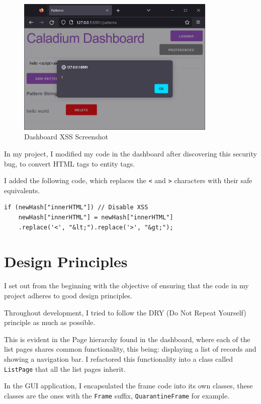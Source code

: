 \begin{figure}[h!]
    \centering
    \label{image:xssScreenshot}
    \includegraphics[width=0.85\textwidth]{images/screenshots/xss}
    \caption{Dashboard XSS Screenshot}
\end{figure}

In my project, I modified my code in the dashboard
after discovering this security bug,
to convert HTML tags to entity tags.

I added the following code, which replaces the \texttt{<}
and \texttt{>} characters with their safe equivalents.

\begin{lstlisting}
if (newHash["innerHTML"]) // Disable XSS
    newHash["innerHTML"] = newHash["innerHTML"]
    .replace('<', "&lt;").replace('>', "&gt;");
\end{lstlisting}

\section{Design Principles}
I set out from the beginning with the objective of
ensuring that the code in my project adheres to good design principles.

Throughout development, I tried to follow the
DRY (Do Not Repeat Yourself) principle as much as possible.

This is evident in the Page hierarchy found in the dashboard,
where each of the list pages shares common functionality,
this being: displaying a list of records and showing a navigation bar.
I refactored this functionality into a class called \texttt{ListPage}
that all the list pages inherit.

In the GUI application, I encapsulated the frame code into its own classes,
these classes are the ones with the \texttt{Frame} suffix,
\texttt{QuarantineFrame} for example.

